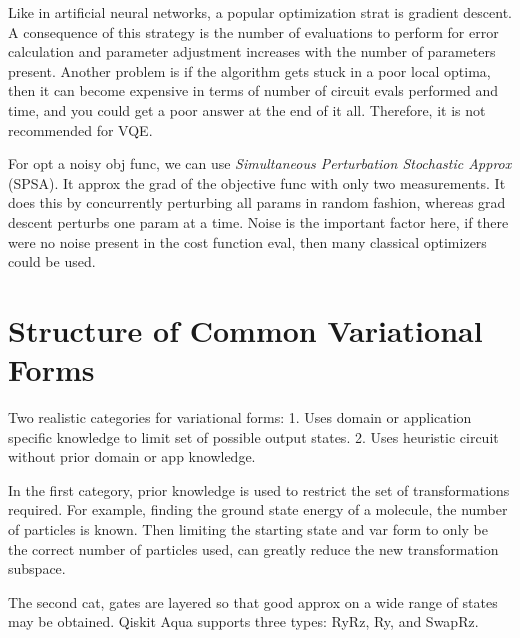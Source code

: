 \documentclass[preprint,aps,prd,nofootinbib,superscriptaddress]{revtex4-2}
\begin{document}
%
Like in artificial neural networks, a popular optimization strat is gradient descent. A consequence of this strategy is the number of evaluations to perform for error calculation and parameter adjustment increases with the number of parameters present. Another problem is if the algorithm gets stuck in a poor local optima, then it can become expensive in terms of number of circuit evals performed and time, and you could get a poor answer at the end of it all. Therefore, it is not recommended for VQE.
%

%
For opt a noisy obj func, we can use \textit{Simultaneous Perturbation Stochastic Approx} (SPSA). It approx the grad of the objective func with only two measurements. It does this by concurrently perturbing all params in random fashion, whereas grad descent perturbs one param at
a time. Noise is the important factor here, if there were no noise present in the cost function eval, then many classical optimizers could be used.
%


\section{Structure of Common Variational Forms}
%
Two realistic categories for variational forms: 1. Uses domain or application specific knowledge to limit set of possible output states. 2. Uses heuristic circuit without prior domain or app knowledge.
%

%
In the first category, prior knowledge is used to restrict the set of transformations required. For example, finding the ground state energy of a molecule, the number of particles is known. Then limiting the starting state and var form to only be the correct number of particles used, can greatly reduce the new transformation subspace.
%

%
The second cat, gates are layered so that good approx on a wide range of states may be obtained. Qiskit Aqua supports three types: RyRz, Ry, and SwapRz.


\begin{thebibliography}{99}



\end{thebibliography}
\end{document}
